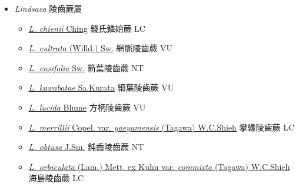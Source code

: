 
  \begin{itemize}
 \item[] \textit{Lindsaea} 陵齒蕨屬
                    
  \begin{itemize}
        \item[] \href{http://www.theplantlist.org/tpl1.1/search?q=Lindsaea+chienii}{\textit{L. chienii} Ching}   錢氏鱗始蕨 LC
        \item[] \href{http://www.theplantlist.org/tpl1.1/search?q=Lindsaea+cultrata}{\textit{L. cultrata} (Willd.) Sw.}   網脈陵齒蕨 VU
        \item[] \href{http://www.theplantlist.org/tpl1.1/search?q=Lindsaea+ensifolia}{\textit{L. ensifolia} Sw.}   箭葉陵齒蕨 NT
        \item[] \href{http://www.theplantlist.org/tpl1.1/search?q=Lindsaea+kawabatae}{\textit{L. kawabatae} Sa.Kurata}   細葉陵齒蕨 VU
        \item[] \href{http://www.theplantlist.org/tpl1.1/search?q=Lindsaea+lucida}{\textit{L. lucida} Blume}     方柄陵齒蕨 VU
        \item[] \href{http://www.theplantlist.org/tpl1.1/search?q=Lindsaea+merrillii+var.+yaeyamensis}{\textit{L. merrillii} Copel. var. \textit{yaeyamensis} (Tagawa) W.C.Shieh}   攀緣陵齒蕨 LC
        \item[] \href{http://www.theplantlist.org/tpl1.1/search?q=Lindsaea+obtusa}{\textit{L. obtusa} J.Sm.}   鈍齒陵齒蕨 NT
        \item[] \href{http://www.theplantlist.org/tpl1.1/search?q=Lindsaea+orbiculata+var.+commixta}{\textit{L. orbiculata} (Lam.) Mett. ex Kuhn var. \textit{commixta} (Tagawa) W.C.Shieh}   海島陵齒蕨 LC

\end{itemize}
\end{itemize}
